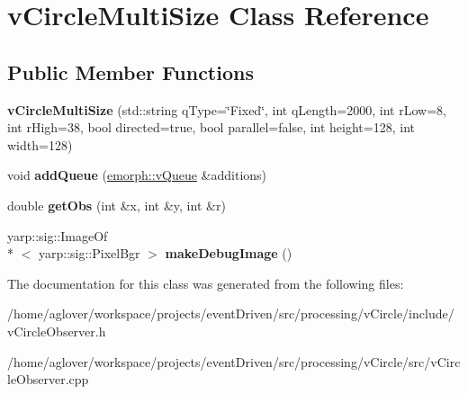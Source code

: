 \hypertarget{classvCircleMultiSize}{\section{v\-Circle\-Multi\-Size Class Reference}
\label{classvCircleMultiSize}
}
\subsection*{Public Member Functions}
\begin{DoxyCompactItemize}
\item 
\hypertarget{classvCircleMultiSize_a366696892bbe5b156211e15c863eff26}{{\bfseries v\-Circle\-Multi\-Size} (std\-::string q\-Type=\char`\"{}Fixed\char`\"{}, int q\-Length=2000, int r\-Low=8, int r\-High=38, bool directed=true, bool parallel=false, int height=128, int width=128)}\label{classvCircleMultiSize_a366696892bbe5b156211e15c863eff26}

\item 
\hypertarget{classvCircleMultiSize_aae2be51a17ecc1dad90d75a1f60a50ee}{void {\bfseries add\-Queue} (\hyperlink{classemorph_1_1vQueue}{emorph\-::v\-Queue} \&additions)}\label{classvCircleMultiSize_aae2be51a17ecc1dad90d75a1f60a50ee}

\item 
\hypertarget{classvCircleMultiSize_a661f425152259951f87167bdcd53caaf}{double {\bfseries get\-Obs} (int \&x, int \&y, int \&r)}\label{classvCircleMultiSize_a661f425152259951f87167bdcd53caaf}

\item 
\hypertarget{classvCircleMultiSize_a1dc2c81da6abc8aaaaedf0d169ad9671}{yarp\-::sig\-::\-Image\-Of\\*
$<$ yarp\-::sig\-::\-Pixel\-Bgr $>$ {\bfseries make\-Debug\-Image} ()}\label{classvCircleMultiSize_a1dc2c81da6abc8aaaaedf0d169ad9671}

\end{DoxyCompactItemize}


The documentation for this class was generated from the following files\-:\begin{DoxyCompactItemize}
\item 
/home/aglover/workspace/projects/event\-Driven/src/processing/v\-Circle/include/v\-Circle\-Observer.\-h\item 
/home/aglover/workspace/projects/event\-Driven/src/processing/v\-Circle/src/v\-Circle\-Observer.\-cpp\end{DoxyCompactItemize}

